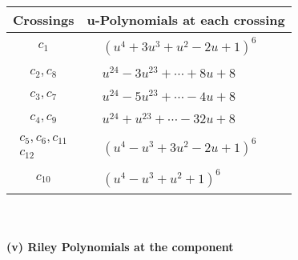 \documentclass[1p]{elsarticle_modified}
\theoremstyle{definition}
\begin{document}
\begin{tabular}{m{50pt}|m{274pt}}
Crossings & \hspace{64pt}u-Polynomials at each crossing \\
\hline $$\begin{aligned}c_{1}\end{aligned}$$&$\begin{aligned}
&(u^4+3 u^3+u^2-2 u+1)^6
\end{aligned}$\\
\hline $$\begin{aligned}c_{2},c_{8}\end{aligned}$$&$\begin{aligned}
&u^{24}-3 u^{23}+\cdots+8 u+8
\end{aligned}$\\
\hline $$\begin{aligned}c_{3},c_{7}\end{aligned}$$&$\begin{aligned}
&u^{24}-5 u^{23}+\cdots-4 u+8
\end{aligned}$\\
\hline $$\begin{aligned}c_{4},c_{9}\end{aligned}$$&$\begin{aligned}
&u^{24}+u^{23}+\cdots-32 u+8
\end{aligned}$\\
\hline $$\begin{aligned}c_{5},c_{6},c_{11}\\c_{12}\end{aligned}$$&$\begin{aligned}
&(u^4- u^3+3 u^2-2 u+1)^6
\end{aligned}$\\
\hline $$\begin{aligned}c_{10}\end{aligned}$$&$\begin{aligned}
&(u^4- u^3+u^2+1)^6
\end{aligned}$\\
\hline
\end{tabular}\\~\\
\newpage\renewcommand{\arraystretch}{1}
\flushleft \textbf{(v) Riley Polynomials at the component}\newline \\
\end{document}
